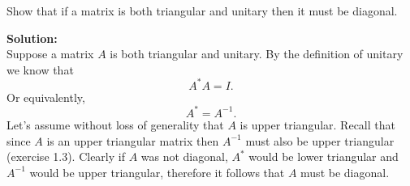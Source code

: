 \documentclass[12pt]{article}
\makeatletter
\theoremstyle{homework}
\newenvironment{exercise}[1]
{\def\@currentlabel{#1}\exercisecore}
{\endexercisecore}
\newcommand{\localhead}[1]{\par\smallskip\noindent\textbf{#1}\nobreak\\}%
\newcommand\solution{\localhead{Solution:}}
\makeatother
\begin{document}
\vspace{.25in}

\begin{exercise}{2.1} Show that if a matrix is both triangular and unitary then it 
  must be diagonal.\\
  \solution Suppose a matrix $A$ is both triangular and unitary. By the definition of unitary we know that 
  \begin{equation*}
    A^*A = I. 
  \end{equation*}
  Or equivalently, 
  \begin{equation*}
    A^* = A^{-1}. 
  \end{equation*}
  Let's assume without loss of generality that $A$ is upper triangular. Recall that since $A$ is an upper triangular matrix then $A^{-1}$ must also be upper triangular (exercise 1.3).
  Clearly if $A$ was not diagonal, $A^*$ would be lower triangular and $A^{-1}$ would be upper triangular, therefore 
  it follows that $A$ must be diagonal. 
\end{exercise}

\vspace{.25in}
\end{document}
